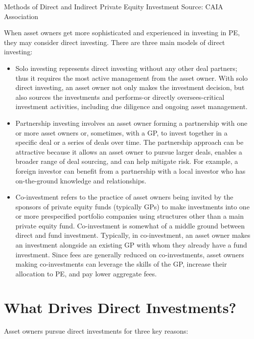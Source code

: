 \documentclass[11pt]{article}
\begin{document}
Methods of Direct and Indirect Private Equity Investment Source: CAIA Association

When asset owners get more sophisticated and experienced in investing in PE, they may consider direct investing. There are three main models of direct investing:

\begin{itemize}
  \item Solo investing represents direct investing without any other deal partners; thus it requires the most active management from the asset owner. With solo direct investing, an asset owner not only makes the investment decision, but also sources the investments and performs-or directly oversees-critical investment activities, including due diligence and ongoing asset management.
  \item Partnership investing involves an asset owner forming a partnership with one or more asset owners or, sometimes, with a GP, to invest together in a specific deal or a series of deals over time. The partnership approach can be attractive because it allows an asset owner to pursue larger deals, enables a broader range of deal sourcing, and can help mitigate risk. For example, a foreign investor can benefit from a partnership with a local investor who has on-the-ground knowledge and relationships.
  \item Co-investment refers to the practice of asset owners being invited by the sponsors of private equity funds (typically GPs) to make investments into one or more prespecified portfolio companies using structures other than a main private equity fund. Co-investment is somewhat of a middle ground between direct and fund investment. Typically, in co-investment, an asset owner makes an investment alongside an existing GP with whom they already have a fund investment. Since fees are generally reduced on co-investments, asset owners making co-investments can leverage the skills of the GP, increase their allocation to PE, and pay lower aggregate fees.
\end{itemize}

\section*{What Drives Direct Investments?}
Asset owners pursue direct investments for three key reasons:
\end{document}
